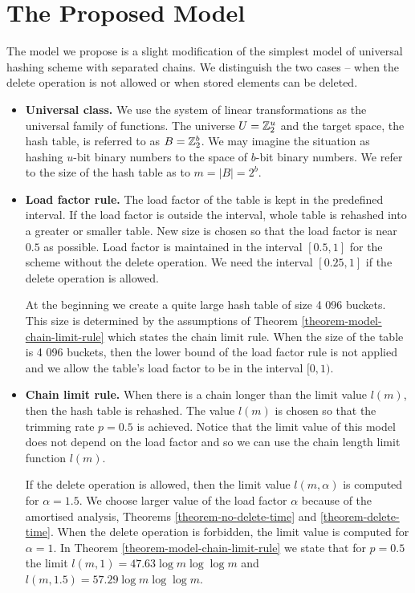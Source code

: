 \section{The Proposed Model}
\label{section-proposed-model}
The model we propose is a slight modification of the simplest model of universal hashing scheme with separated chains. We distinguish the two cases -- when the delete operation is not allowed or when stored elements can be deleted.
\begin{itemize}
\item \textbf{Universal class.} We use the system of linear transformations as the universal family of functions. The universe $U = \mathbb{Z}_{2}^{u}$ and the target space, the hash table, is referred to as $B = \mathbb{Z}_{2}^{b}$. We may imagine the situation as hashing $u$-bit binary numbers to the space of $b$-bit binary numbers. We refer to the size of the hash table as to $m = |B| = 2 ^ b$.

\item \textbf{Load factor rule.} The load factor of the table is kept in the predefined interval. If the load factor is outside the interval, whole table is rehashed into a greater or smaller table. New size is chosen so that the load factor is near $0.5$ as possible. Load factor is maintained in the interval $\left[0.5, 1\right]$ for the scheme without the delete operation. We need the interval $\left[0.25, 1\right]$ if the delete operation is allowed.

At the beginning we create a quite large hash table of size 4 096 buckets. This size is determined by the assumptions of Theorem \ref{theorem-model-chain-limit-rule} which states the chain limit rule. When the size of the table is 4 096 buckets, then the lower bound of the load factor rule is not applied and we allow the table's load factor to be in the interval $[0, 1)$.

\item \textbf{Chain limit rule.} When there is a chain longer than the limit value $l(m)$, then the hash table is rehashed. The value $l(m)$ is chosen so that the trimming rate $p = 0.5$ is achieved. Notice that the limit value of this model does not depend on the load factor and so we can use the chain length limit function $l(m)$.

If the delete operation is allowed, then the limit value $l(m, \alpha)$ is computed for $\alpha = 1.5$. We choose larger value of the load factor $\alpha$ because of the amortised analysis, Theorems \ref{theorem-no-delete-time} and \ref{theorem-delete-time}. When the delete operation is forbidden, the limit value is computed for $\alpha = 1$. In Theorem \ref{theorem-model-chain-limit-rule} we state that for $p = 0.5$ the limit $l(m, 1) = 47.63 \log m \log \log m$ and $l(m, 1.5) = 57.29 \log m \log \log m$.
\end{itemize}

